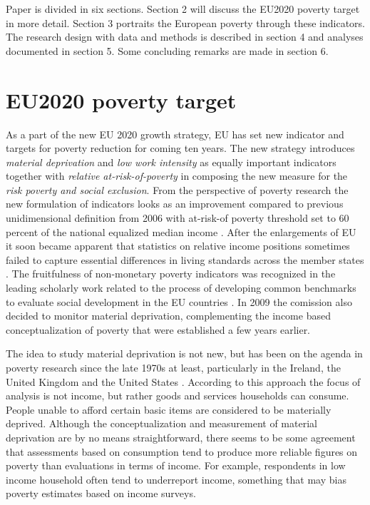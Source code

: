 \documentclass[11pt, a4paper]{article}\usepackage{graphicx, color}
\begin{document}
Paper is divided in six sections. Section 2 will discuss the EU2020 poverty target in more detail. Section 3 portraits the European poverty through these indicators. The research design with data and methods is described in section 4 and analyses documented in section 5. Some concluding remarks are made in section 6.

\section{EU2020 poverty target}
As a part of the new EU 2020 growth strategy, EU has set new indicator and targets for poverty reduction for coming ten years. The new strategy introduces \textit{material deprivation} and \textit{low work intensity} as equally important indicators together with \textit{relative at-risk-of-poverty} in composing the new measure for the \emph{risk poverty and social exclusion}. From the perspective of poverty research the new formulation of indicators looks as an improvement compared to previous unidimensional definition from 2006 with at-risk-of poverty threshold set to 60 percent of the national equalized median income \citep{commission_portfolio_2006}. After the enlargements of EU it soon became apparent that statistics on relative income positions sometimes failed to capture essential differences in living standards across the member states \citep{marlier_eu_2007}. The fruitfulness of non-monetary poverty indicators was recognized in the leading scholarly work related to the process of developing common benchmarks to evaluate social development in the EU countries \citep{atkinson_social_2002}. In 2009 the comission also decided to monitor material deprivation, complementing the income based conceptualization of poverty that were established a few years earlier.

The idea to study material deprivation is not new, but has been on the agenda in poverty research since the late 1970s at least, particularly in the Ireland, the United Kingdom and the United States \citep{townsend_poverty_1979,mack_poor_1985,nolan_resources_1996}. According to this approach the focus of analysis is not income, but rather goods and services households can consume. People unable to afford certain basic items are considered to be materially deprived.  Although the conceptualization and measurement of material deprivation are by no means straightforward, there seems to be some agreement that assessments based on consumption tend to produce more reliable figures on poverty than evaluations in terms of income. For example, respondents in low income household often tend to underreport income, something that may bias poverty estimates based on income surveys.
\end{document}
